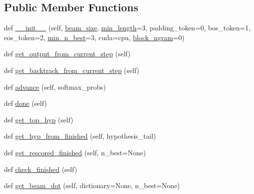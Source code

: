 \subsection*{Public Member Functions}
\begin{DoxyCompactItemize}
\item 
def \hyperlink{classcontrollable__seq2seq_1_1controllable__seq2seq_1_1Beam_a10dd7af39b66b89f4ef0181c204452a8}{\+\_\+\+\_\+init\+\_\+\+\_\+} (self, \hyperlink{classcontrollable__seq2seq_1_1controllable__seq2seq_1_1Beam_a4b977282ad9c275896a1a253bb5f40f7}{beam\+\_\+size}, \hyperlink{classcontrollable__seq2seq_1_1controllable__seq2seq_1_1Beam_a0e26e14bd1c352f33464fab45ae39675}{min\+\_\+length}=3, padding\+\_\+token=0, bos\+\_\+token=1, eos\+\_\+token=2, \hyperlink{classcontrollable__seq2seq_1_1controllable__seq2seq_1_1Beam_aa76753baab725ffa547c5512653f537b}{min\+\_\+n\+\_\+best}=3, cuda=\textquotesingle{}cpu\textquotesingle{}, \hyperlink{classcontrollable__seq2seq_1_1controllable__seq2seq_1_1Beam_ad43521d7231db0e76f0788d63a29486d}{block\+\_\+ngram}=0)
\item 
def \hyperlink{classcontrollable__seq2seq_1_1controllable__seq2seq_1_1Beam_a45cfd3d054f6ec009e6916f01f8c3528}{get\+\_\+output\+\_\+from\+\_\+current\+\_\+step} (self)
\item 
def \hyperlink{classcontrollable__seq2seq_1_1controllable__seq2seq_1_1Beam_ab391098d78edb7a48245bef1873b0df0}{get\+\_\+backtrack\+\_\+from\+\_\+current\+\_\+step} (self)
\item 
def \hyperlink{classcontrollable__seq2seq_1_1controllable__seq2seq_1_1Beam_aaabdc74d8e5ffec4cd92b7fd350aaaf4}{advance} (self, softmax\+\_\+probs)
\item 
def \hyperlink{classcontrollable__seq2seq_1_1controllable__seq2seq_1_1Beam_af40dafdaad342152b89d8c4f517c8d8b}{done} (self)
\item 
def \hyperlink{classcontrollable__seq2seq_1_1controllable__seq2seq_1_1Beam_a5224a8abe07503fe549bc6e2140eb244}{get\+\_\+top\+\_\+hyp} (self)
\item 
def \hyperlink{classcontrollable__seq2seq_1_1controllable__seq2seq_1_1Beam_ab4532f62a0428f5581680c9915b9c95e}{get\+\_\+hyp\+\_\+from\+\_\+finished} (self, hypothesis\+\_\+tail)
\item 
def \hyperlink{classcontrollable__seq2seq_1_1controllable__seq2seq_1_1Beam_a18e46c4a301f453b669101bd539e2d53}{get\+\_\+rescored\+\_\+finished} (self, n\+\_\+best=None)
\item 
def \hyperlink{classcontrollable__seq2seq_1_1controllable__seq2seq_1_1Beam_a44d2a312bb404a444f077a19a759cd77}{check\+\_\+finished} (self)
\item 
def \hyperlink{classcontrollable__seq2seq_1_1controllable__seq2seq_1_1Beam_a4d1acfa68e54ee73cc7fbcb7f334bf99}{get\+\_\+beam\+\_\+dot} (self, dictionary=None, n\+\_\+best=None)
\end{DoxyCompactItemize}
